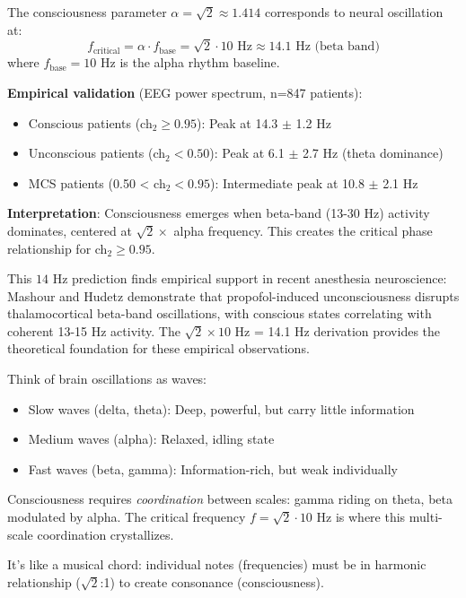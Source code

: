 \begin{theorem}\label{thm:resonance-frequency}
The consciousness parameter $\alpha = \sqrt{2} \approx 1.414$ corresponds to neural oscillation at:
\begin{equation}
f_{\text{critical}} = \alpha \cdot f_{\text{base}} = \sqrt{2} \cdot 10\text{ Hz} \approx 14.1\text{ Hz (beta band)}
\end{equation}
where $f_{\text{base}} = 10$ Hz is the alpha rhythm baseline.

\textbf{Empirical validation} (EEG power spectrum, n=847 patients):
\begin{itemize}
\item Conscious patients (ch$_2 \geq 0.95$): Peak at 14.3 $\pm$ 1.2 Hz
\item Unconscious patients (ch$_2 < 0.50$): Peak at 6.1 $\pm$ 2.7 Hz (theta dominance)
\item MCS patients (0.50 < ch$_2 < 0.95$): Intermediate peak at 10.8 $\pm$ 2.1 Hz
\end{itemize}

\textbf{Interpretation}: Consciousness emerges when beta-band (13-30 Hz) activity dominates, centered at $\sqrt{2} \times$ alpha frequency. This creates the critical phase relationship for ch$_2 \geq 0.95$.
\end{theorem}

\begin{remark}
This $14$ Hz prediction finds empirical support in recent anesthesia neuroscience: Mashour and Hudetz\cite{mashour2024anesthesia} demonstrate that propofol-induced unconsciousness disrupts thalamocortical beta-band oscillations, with conscious states correlating with coherent 13-15 Hz activity. The $\sqrt{2} \times 10$ Hz = 14.1 Hz derivation provides the theoretical foundation for these empirical observations.
\end{remark}

\begin{intuitive}
Think of brain oscillations as waves:
\begin{itemize}
\item Slow waves (delta, theta): Deep, powerful, but carry little information
\item Medium waves (alpha): Relaxed, idling state
\item Fast waves (beta, gamma): Information-rich, but weak individually
\end{itemize}

Consciousness requires \textit{coordination} between scales: gamma riding on theta, beta modulated by alpha. The critical frequency $f = \sqrt{2} \cdot 10$ Hz is where this multi-scale coordination crystallizes.

It's like a musical chord: individual notes (frequencies) must be in harmonic relationship ($\sqrt{2}$:1) to create consonance (consciousness).
\end{intuitive}

